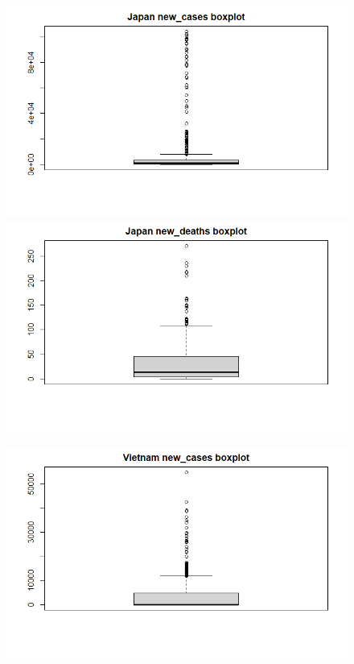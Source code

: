 \documentclass[a4paper]{article}
\theoremstyle{definition}
\begin{document}
\begin{enumerate}[1)]
\begin{figure}[H]
        \begin{center}
            \includegraphics[scale=0.4]{ii/japan box cases.png}
            \includegraphics[scale=0.4]{ii/japan box deaths.png}
        \end{center}
    \end{figure}
    \begin{figure}[H]
        \begin{center}
            \includegraphics[scale=0.4]{ii/vietnam box cases.png}

\end{center}
\end{figure}
\end{enumerate}
\end{document}
